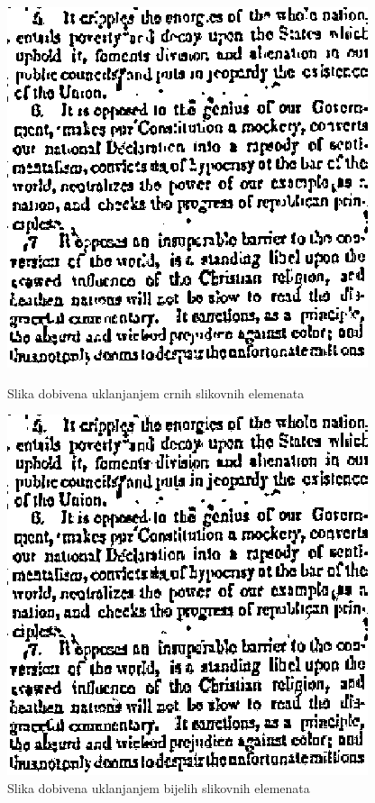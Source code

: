 \documentclass[times, utf8, zavrsni, numeric]{fer}
\begin{document}
\begin{figure}[!ht]
\centering
\begin{minipage}{.5\textwidth}
    \centering
    \includegraphics[width=.85\linewidth]{Images/Shrinked.png}
    \captionsetup{justification=centering}
    \caption{Slika dobivena uklanjanjem crnih slikovnih elemenata}
    \label{fig:shrink}
\end{minipage}%
\begin{minipage}{.5\textwidth}
    \centering
    \includegraphics[width=.85\linewidth]{Images/Swell.png}
    \captionsetup{justification=centering}
    \caption{Slika dobivena uklanjanjem bijelih slikovnih elemenata}
    \label{fig:swell}
\end{minipage}
\end{figure}
\end{document}
